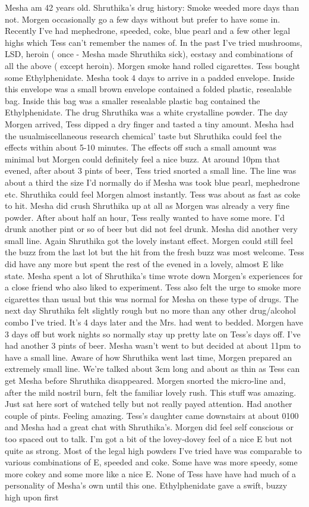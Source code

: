\documentclass[12pt]{book}
\begin{document}
Mesha am 42 years old. Shruthika's drug history: Smoke weeded more days than not. Morgen occasionally go a few days without but prefer to have some in. Recently I've had mephedrone, speeded, coke, blue pearl and a few other legal highs which Tess can't remember the names of. In the past I've tried mushrooms, LSD, heroin ( once - Mesha made Shruthika sick), ecstasy and combinations of all the above ( except heroin). Morgen smoke hand rolled cigarettes. Tess bought some Ethylphenidate. Mesha took 4 days to arrive in a padded envelope. Inside this envelope was a small brown envelope contained a folded plastic, resealable bag. Inside this bag was a smaller resealable plastic bag contained the Ethylphenidate. The drug Shruthika was a white crystalline powder. The day Morgen arrived, Tess dipped a dry finger and tasted a tiny amount. Mesha had the usualmiscellaneous research chemical' taste but Shruthika could feel the effects within about 5-10 minutes. The effects off such a small amount was minimal but Morgen could definitely feel a nice buzz. At around 10pm that evened, after about 3 pints of beer, Tess tried snorted a small line. The line was about a third the size I'd normally do if Mesha was took blue pearl, mephedrone etc. Shruthika could feel Morgen almost instantly. Tess was about as fast as coke to hit. Mesha did crush Shruthika up at all as Morgen was already a very fine powder. After about half an hour, Tess really wanted to have some more. I'd drunk another pint or so of beer but did not feel drunk. Mesha did another very small line. Again Shruthika got the lovely instant effect. Morgen could still feel the buzz from the last lot but the hit from the fresh buzz was most welcome. Tess did have any more but spent the rest of the evened in a lovely, almost E like state. Mesha spent a lot of Shruthika's time wrote down Morgen's experiences for a close friend who also liked to experiment. Tess also felt the urge to smoke more cigarettes than usual but this was normal for Mesha on these type of drugs. The next day Shruthika felt slightly rough but no more than any other drug/alcohol combo I've tried. It's 4 days later and the Mrs. had went to bedded. Morgen have 3 days off but work nights so normally stay up pretty late on Tess's days off. I've had another 3 pints of beer. Mesha wasn't went to but decided at about 11pm to have a small line. Aware of how Shruthika went last time, Morgen prepared an extremely small line. We're talked about 3cm long and about as thin as Tess can get Mesha before Shruthika disappeared. Morgen snorted the micro-line and, after the mild nostril burn, felt the familiar lovely rush. This stuff was amazing. Just sat here sort of watched telly but not really payed attention. Had another couple of pints. Feeling amazing. Tess's daughter came downstairs at about 0100 and Mesha had a great chat with Shruthika's. Morgen did feel self conscious or too spaced out to talk. I'm got a bit of the lovey-dovey feel of a nice E but not quite as strong. Most of the legal high powders I've tried have was comparable to various combinations of E, speeded and coke. Some have was more speedy, some more cokey and some more like a nice E. None of Tess have have had much of a personality of Mesha's own until this one. Ethylphenidate gave a swift, buzzy high upon first 
\end{document}
